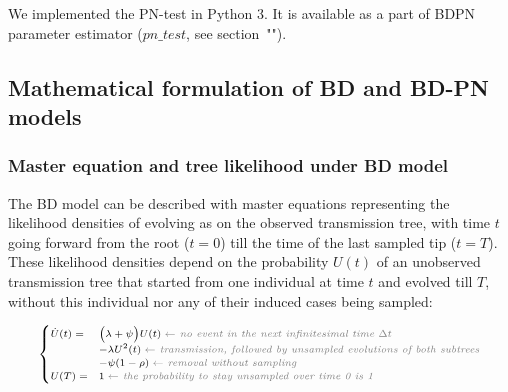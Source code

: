 \documentclass[10pt,letterpaper]{article}
\begin{document}


We implemented the PN-test in Python 3. It is available as a part of BDPN parameter estimator ($pn\_test$, see section~"").

 

\subsection*{Mathematical formulation of BD and BD-PN models}\label{math}


\subsubsection*{Master equation and tree likelihood under BD model}
The BD model can be described with master equations representing the likelihood densities of evolving as on the observed transmission tree, with time $t$ going forward from the root ($t=0$) till the time of the last sampled tip ($t=T$). These likelihood densities depend on the probability $U(t)$ of an unobserved transmission tree that started from one individual at time $t$ and evolved till $T$, without this individual nor any of their induced cases being sampled: 

\begin{equation}
\scriptsize
\begin{cases}
\dot{U}(t) = &\Big(\lambda + \psi\Big) U(t)\; \textit{\color{gray} $\leftarrow$ no event in the next infinitesimal time $\Delta t$ }\\
    &- \lambda U^2(t) \;  \textit{\color{gray} $\leftarrow$ transmission, followed by unsampled evolutions of both subtrees}\\
    &- \psi (1 - \rho)\;  \textit{\color{gray} $\leftarrow$ removal without sampling}\\
U(T) = & 1\;  \textit{\color{gray} $\leftarrow$ the probability to stay unsampled over time 0 is 1} \label{eq:Us}
\end{cases}
\end{equation}
\end{document}
